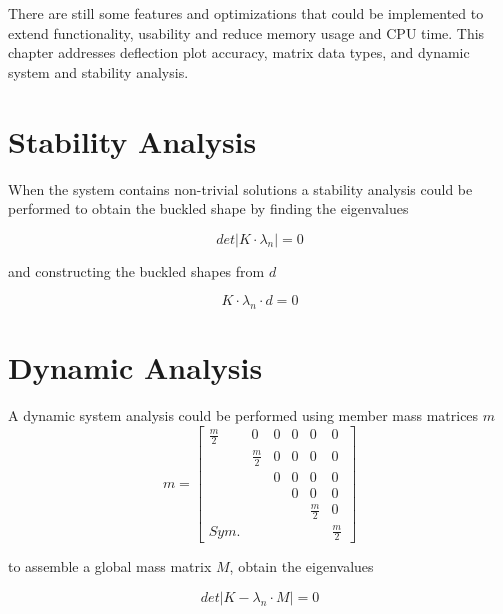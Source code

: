 There are still some features and optimizations that could be implemented to extend functionality, usability and reduce memory usage and CPU time.
This chapter addresses deflection plot accuracy, matrix data types, and dynamic system and stability analysis.

\section{Stability Analysis}
\label{sec:stabAna}

When the system contains non-trivial solutions a stability analysis could be performed to obtain the buckled shape by finding the eigenvalues

\begin{equation*} \label{eigenvalues}
det \lvert K \cdot \lambda_n \lvert = 0 
\end{equation*}

and constructing the buckled shapes from $d$

\begin{equation*} \label{buckle}
K \cdot \lambda_n \cdot d = 0
\end{equation*}

\section{Dynamic Analysis}
\label{sec:dynAna}

A dynamic system analysis could be performed using member mass matrices $m$ 
\begin{equation} \label{strut3}
    m = \begin{bmatrix}
        \frac{m}{2}  & 0		   & 0 & 0 & 0           & 0 \\
                     & \frac{m}{2} & 0 & 0 & 0           & 0 \\
                     &             & 0 & 0 & 0           & 0 \\
                     &             &   & 0 & 0           & 0 \\
                     &             &   &   & \frac{m}{2} & 0 \\
        Sym.         &             &   &   &             & \frac{m}{2}
    \end{bmatrix}
\end{equation}

to assemble a global mass matrix $M$, obtain the eigenvalues

\begin{equation*} \label{eigenvalues2}
det \lvert K - \lambda_n \cdot M \lvert = 0 
\end{equation*}

